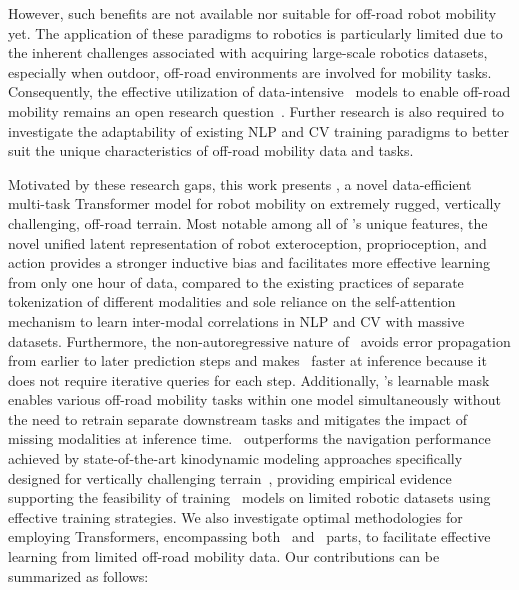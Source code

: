 However, such benefits are not available nor suitable for off-road robot mobility yet. 
The application of these paradigms to robotics is particularly limited due to the inherent challenges associated with acquiring large-scale robotics datasets, 
especially when outdoor, off-road environments are involved for mobility tasks. Consequently, the effective utilization of data-intensive \tr~models to enable off-road mobility remains an open research question~\cite{firoozi2023foundation}. Further research is also required to investigate the adaptability of existing NLP and CV training paradigms to better suit the unique characteristics of off-road mobility data and tasks.


Motivated by these research gaps, this work presents \former, a novel data-efficient multi-task Transformer model for robot mobility on extremely rugged, vertically challenging, off-road terrain. 
Most notable among all of \former's unique features,  the novel unified latent representation of robot exteroception, proprioception, and action provides a stronger inductive bias and facilitates more effective learning from only one hour of data, compared to the existing practices of separate tokenization of different modalities and sole reliance on the self-attention mechanism to learn inter-modal correlations in NLP and CV with massive datasets. Furthermore, the non-autoregressive nature of \former~avoids error propagation from earlier to later prediction steps and makes \former~faster at inference because it does not require iterative queries for each step.
Additionally, \former's learnable mask enables various off-road mobility tasks within one model simultaneously without the need to retrain separate downstream tasks and mitigates the impact of missing modalities at inference time. 
\former~outperforms the navigation performance achieved by state-of-the-art kinodynamic modeling approaches specifically designed for vertically challenging terrain~\cite{datar2024terrainattentive}, providing empirical evidence supporting the feasibility of training \tr~models on limited robotic datasets using effective training strategies. We also investigate optimal methodologies for employing Transformers, encompassing both \encoder~and \decoder~parts, to facilitate effective learning from limited off-road mobility data. Our contributions can be summarized as follows: 


